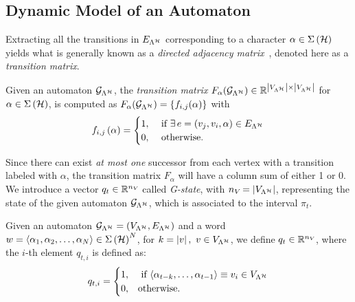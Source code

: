 \subsection{Dynamic Model of an Automaton}
\label{ssec:dynamicgraph}
%
Extracting all the transitions in $E_{\Lambda^{\mathcal{H}}}$ corresponding to a character $\alpha \in \Sigma\left(\mathcal{H}\right)$ yields what is generally known as a \emph{directed adjacency matrix}~\cite{xu2012matrix}, denoted here as a \emph{transition matrix}.
\begin{definition}%
    \label{def:transition}%
    Given an automaton $\mathcal{G}_{\Lambda^{\mathcal{H}}}$, the \emph{transition matrix} $F_{\alpha} ( \mathcal{G}_{\Lambda^{\mathcal{H}}} ) \in \mathbb{R}^{\left|V_{\Lambda^{\mathcal{H}}}\right| \times \left|V_{\Lambda^{\mathcal{H}}}\right|}$ for $\alpha\in\Sigma\left(\mathcal{H}\right)$, is computed as $F_{\alpha} ( \mathcal{G}_{\Lambda^{\mathcal{H}}} ) = \{f_{i,j}(\alpha)\}$ with
    \begin{equation*}
        f_{i,j}\left( \alpha \right)=
        \begin{cases}
            1, &\text{ if } \exists \, e=(v_j,v_i,\alpha) \in E_{\Lambda^{\mathcal{H}}} \\
            0, &\text{ otherwise.}
        \end{cases}
        \end{equation*}%
\end{definition}
%
Since there can exist \emph{at most one} successor from each vertex with a transition labeled with $\alpha$, the transition matrix $F_\alpha$ will have a column sum of either 1 or 0.
We introduce a vector $q_t\in \mathbb{R}^{n_{V_{}}}$ called \emph{G-state}, with $n_{V_{}} =\left|V_{\Lambda^{\mathcal{H}}}\right|$, representing the state of the given automaton $\mathcal{G}_{\Lambda^{\mathcal{H}}}$, which is associated to the interval $\pi_t$.
%
\begin{definition}[G-state]%
    \label{def:qt}%
    Given an automaton $\mathcal{G}_{\Lambda^{\mathcal{H}}} = (V_{\Lambda^{\mathcal{H}}}, E_{\Lambda^{\mathcal{H}}})$ and a word $w = \langle \alpha_1,\alpha_2,\dots,\alpha_N \rangle \in \Sigma\left( \mathcal{H} \right)^N$, for $k = \left|v\right|,\,\, v\in V_{\Lambda^{\mathcal{H}}}$, we define $q_t\in \mathbb{R}^{n_{V_{}}}$, where the $i$-th element $q_{t,i}$ is defined as:
    \begin{equation*}
        q_{t,i}=
        \begin{cases}
            1, &\text{ if } \langle \alpha_{t-k},\dots,\alpha_{t-1} \rangle \equiv v_i \in V_{\Lambda^{\mathcal{H}}} \\
            0, &\text{otherwise}.
        \end{cases}
    \end{equation*}
\end{definition}
